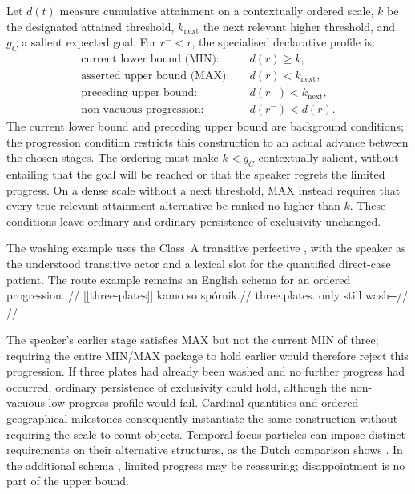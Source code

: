 Let $d(t)$ measure cumulative attainment on a contextually ordered scale,
$k$ be the designated attained threshold, $k_{\mathrm{next}}$ the next
relevant higher threshold, and $g_C$ a salient expected goal. For
$r^{-}<r$, the specialised declarative profile is:
\[
\begin{aligned}
\text{current lower bound (MIN):}\quad & d(r)\geq k,\\
\text{asserted upper bound (MAX):}\quad & d(r)<k_{\mathrm{next}},\\
\text{preceding upper bound:}\quad & d(r^{-})<k_{\mathrm{next}},\\
\text{non-vacuous progression:}\quad & d(r^{-})<d(r).
\end{aligned}
\]
The current lower bound and preceding upper bound are background conditions;
the progression condition restricts this construction to an actual advance
between the chosen stages. The ordering must make $k<g_C$ contextually
salient, without entailing that the goal will be reached or that the speaker
regrets the limited progress. On a dense scale without a next threshold,
MAX instead requires that every true relevant attainment alternative be
ranked no higher than $k$. These conditions leave ordinary  and
ordinary persistence of exclusivity unchanged.

The washing example uses the Class~A transitive perfective
, with the speaker as the understood transitive actor and a
lexical slot for the quantified direct-case patient. The route example
remains an English schema for an ordered progression.
\pex\label{ex:kamo-so-washing-progress}
\a
\begingl
\glpreamble {}//
\gla \textnormal{[[three-plates]]}\textsubscript{\Dir{}} kamo so spórnik.//
\glb three.plates.\Dir{} only still wash-\Trs{}-\Pf{}//
\glft {}//
\endgl
\a {}
\xe

The speaker's earlier stage satisfies MAX but not the current MIN of three;
requiring the entire MIN/MAX package to hold earlier would therefore reject
this progression. If three plates had already been washed and no further
progress had occurred, ordinary persistence of exclusivity could hold,
although the non-vacuous low-progress profile would fail. Cardinal quantities
and ordered geographical milestones consequently instantiate the same
construction without requiring the scale to count objects. Temporal focus
particles can impose distinct requirements on their alternative structures,
as the Dutch comparison shows \cite[§§2--3]{neelemanvandekoot2022}. In the additional
schema , limited
progress may be reassuring; disappointment is no part of the upper bound.

